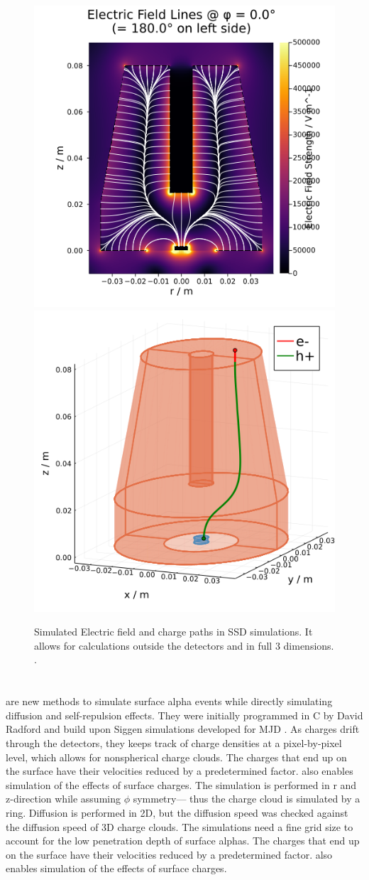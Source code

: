 \begin{figure}
\centering
\includegraphics[width=0.49\linewidth]{ch3/figs/ssd_e.png}
\includegraphics[width=0.49\linewidth]{ch3/figs/ssd_path.png}
\caption{Simulated Electric field and charge paths in SSD simulations. It allows for calculations outside the detectors and in full 3 dimensions. \cite{ssd_web}.}
\label{fig:ssd_plots}
\end{figure}


\section{{\tdsim}}

{\tdsim} are new methods to simulate surface alpha events while directly simulating diffusion and self-repulsion effects. They were initially programmed in C by David Radford and build upon Siggen simulations developed for MJD \cite{siggen_paper}. As charges drift through the detectors, they keeps track of charge densities at a pixel-by-pixel level, which allows for nonspherical charge clouds. The charges that end up on the surface have their velocities reduced by a predetermined factor. {\tdsim} also enables simulation of the effects of surface charges. The simulation is performed in r and z-direction while assuming $\phi$ symmetry— thus the charge cloud is simulated by a ring. Diffusion is performed in 2D, but the diffusion speed was checked against the diffusion speed of 3D charge clouds. The simulations need a fine grid size to account for the low penetration depth of surface alphas. The charges that end up on the surface have their velocities reduced by a predetermined factor. {\tdsim} also enables simulation of the effects of surface charges.


